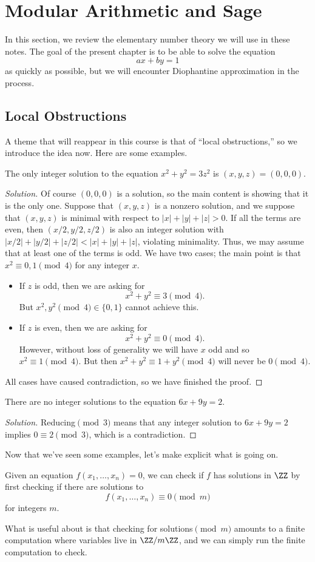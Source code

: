 \documentclass[../notes.tex]{subfiles}
\begin{document}
\section{Modular Arithmetic and Sage}
In this section, we review the elementary number theory we will use in these notes. The goal of the present chapter is to be able to solve the equation
\[ax+by=1\]
as quickly as possible, but we will encounter Diophantine approximation in the process.

\subsection{Local Obstructions}
A theme that will reappear in this course is that of ``local obstructions,'' so we introduce the idea now. Here are some examples.
\begin{example}
	The only integer solution to the equation $x^2+y^2=3z^2$ is $(x,y,z)=(0,0,0)$.
\end{example}
\begin{proof}[Solution]
	Of course $(0,0,0)$ is a solution, so the main content is showing that it is the only one. Suppose that $(x,y,z)$ is a nonzero solution, and we suppose that $(x,y,z)$ is minimal with respect to $\left|x\right|+\left|y\right|+\left|z\right|>0$. If all the terms are even, then $(x/2,y/2,z/2)$ is also an integer solution with $\left|x/2\right|+\left|y/2\right|+\left|z/2\right|<\left|x\right|+\left|y\right|+\left|z\right|$, violating minimality. Thus, we may assume that at least one of the terms is odd. We have two cases; the main point is that $x^2\equiv0,1\pmod4$ for any integer $x$.
	\begin{itemize}
		\item If $z$ is odd, then we are asking for
		\[x^2+y^2\equiv3\pmod4.\]
		But $x^2,y^2\pmod4\in\{0,1\}$ cannot achieve this.
		\item If $z$ is even, then we are asking for
		\[x^2+y^2\equiv0\pmod4.\]
		However, without loss of generality we will have $x$ odd and so $x^2\equiv1\pmod4$. But then $x^2+y^2\equiv1+y^2\pmod4$ will never be $0\pmod4$.
	\end{itemize}
	All cases have caused contradiction, so we have finished the proof.
\end{proof}
\begin{example}
	There are no integer solutions to the equation $6x+9y=2$.
\end{example}
\begin{proof}[Solution]
	Reducing$\pmod3$ means that any integer solution to $6x+9y=2$ implies $0\equiv2\pmod3$, which is a contradiction.
\end{proof}
Now that we've seen some examples, let's make explicit what is going on.
\begin{idea} \label{idea:local}
	Given an equation $f(x_1,\ldots,x_n)=0$, we can check if $f$ has solutions in $\ZZ$ by first checking if there are solutions to
	\[f(x_1,\ldots,x_n)\equiv0\pmod m\]
	for integers $m$.
\end{idea}
What is useful about  is that checking for solutions$\pmod m$ amounts to a finite computation where variables live in $\ZZ/m\ZZ$, and we can simply run the finite computation to check.
\end{document}
